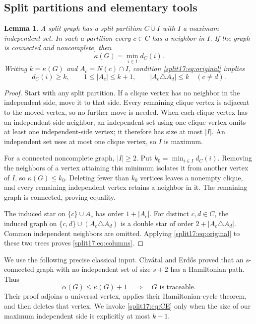 \documentclass[11pt,a4paper]{article}
\newtheorem{lemma}[theorem]{Lemma}
\theoremstyle{definition}\newtheorem{definition}[theorem]{Definition}
\theoremstyle{remark}\newtheorem{remark}[theorem]{Remark}
\begin{document}
\subsection{Split partitions and elementary tools}
\begin{lemma}\label{split17:lem:setup}
A split graph has a split partition $C\mathbin{\dot\cup}I$ with $I$ a
maximum independent set. In such a partition every $c\in C$ has a
neighbor in $I$. If the graph is connected and noncomplete, then
\[
 \kappa(G)=\min_{i\in I}d_C(i).
\]
Writing $k=\kappa(G)$ and $A_c=N(c)\cap I$, condition
\eqref{split17:eq:original} implies
\begin{equation}\label{split17:eq:columns}
 d_C(i)\ge k,\qquad 1\le|A_c|\le k+1,\qquad
 |A_c\triangle A_d|\le k\quad(c\ne d).
\end{equation}
\end{lemma}
\begin{proof}
Start with any split partition. If a clique vertex has no neighbor in the
independent side, move it to that side. Every remaining clique vertex is
adjacent to the moved vertex, so no further move is needed. When each
clique vertex has an independent-side neighbor, an independent set using
one clique vertex omits at least one independent-side vertex; it therefore
has size at most $|I|$. An independent set uses at most one clique vertex,
so $I$ is maximum.

For a connected noncomplete graph, $|I|\ge2$. Put
$k_0=\min_{i\in I}d_C(i)$. Removing the neighbors of a vertex attaining this
minimum isolates it from another vertex of $I$, so $\kappa(G)\le k_0$.
Deleting fewer than $k_0$ vertices leaves a nonempty clique, and every
remaining independent vertex retains a neighbor in it. The remaining
graph is connected, proving equality.

The induced star on $\{c\}\cup A_c$ has order $1+|A_c|$. For distinct
$c,d\in C$, the induced graph on
$\{c,d\}\cup(A_c\triangle A_d)$ is a double star of order
$2+|A_c\triangle A_d|$. Common independent neighbors are omitted. Applying
\eqref{split17:eq:original} to these two trees proves \eqref{split17:eq:columns}.
\end{proof}

We use the following precise classical input. Chv\'atal and Erd\H{o}s
\cite[Theorem 2, p.~112]{src:ce} proved that an $s$-connected graph with no
independent set of size $s+2$ has a Hamiltonian path. Thus
\begin{equation}\label{split17:eq:CE}
 \alpha(G)\le\kappa(G)+1\quad\Longrightarrow\quad
 G\text{ is traceable}.
\end{equation}
Their proof adjoins a universal vertex, applies their Hamiltonian-cycle
theorem, and then deletes that vertex. We invoke \eqref{split17:eq:CE} only when
the size of our maximum independent side is explicitly at most $k+1$.
\end{document}

